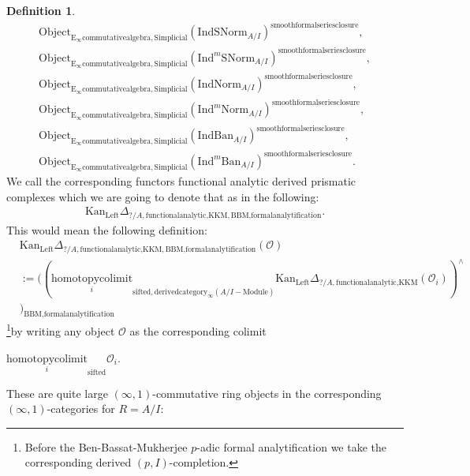 \documentclass[11pt]{book}
\theoremstyle{definition}
\newtheorem{definition}[theorem]{Definition}
\numberwithin{equation}{section}
\begin{document}
\begin{definition}
\begin{align}
\mathrm{Object}_{\mathrm{E}_\infty\mathrm{commutativealgebra},\mathrm{Simplicial}}(\mathrm{IndSNorm}_{A/I})^{\mathrm{smoothformalseriesclosure}},\\
\mathrm{Object}_{\mathrm{E}_\infty\mathrm{commutativealgebra},\mathrm{Simplicial}}(\mathrm{Ind}^m\mathrm{SNorm}_{A/I})^{\mathrm{smoothformalseriesclosure}},\\
\mathrm{Object}_{\mathrm{E}_\infty\mathrm{commutativealgebra},\mathrm{Simplicial}}(\mathrm{IndNorm}_{A/I})^{\mathrm{smoothformalseriesclosure}},\\
\mathrm{Object}_{\mathrm{E}_\infty\mathrm{commutativealgebra},\mathrm{Simplicial}}(\mathrm{Ind}^m\mathrm{Norm}_{A/I})^{\mathrm{smoothformalseriesclosure}},\\
\mathrm{Object}_{\mathrm{E}_\infty\mathrm{commutativealgebra},\mathrm{Simplicial}}(\mathrm{IndBan}_{A/I})^{\mathrm{smoothformalseriesclosure}},\\
\mathrm{Object}_{\mathrm{E}_\infty\mathrm{commutativealgebra},\mathrm{Simplicial}}(\mathrm{Ind}^m\mathrm{Ban}_{A/I})^{\mathrm{smoothformalseriesclosure}}.
\end{align}
We call the corresponding functors functional analytic derived prismatic complexes which we are going to denote that as in the following:
\begin{align}
\mathrm{Kan}_{\mathrm{Left}}\Delta_{?/A,\text{functionalanalytic,KKM},\text{BBM,formalanalytification}}.	
\end{align}
This would mean the following definition:
\begin{align}
&\mathrm{Kan}_{\mathrm{Left}}\Delta_{?/A,\text{functionalanalytic,KKM},\text{BBM,formalanalytification}}(\mathcal{O})\\
&:=	((\underset{i}{\text{homotopycolimit}}_{\text{sifted},\text{derivedcategory}_{\infty}(A/I-\text{Module})}\mathrm{Kan}_{\mathrm{Left}}\Delta_{?/A,\text{functionalanalytic,KKM}}(\mathcal{O}_i))^\wedge\\
&)_\text{BBM,formalanalytification}
\end{align}
\footnote{Before the Ben-Bassat-Mukherjee $p$-adic formal analytification we take the corresponding derived $(p,I)$-completion.}by writing any object $\mathcal{O}$ as the corresponding colimit 
\begin{center}
$\underset{i}{\text{homotopycolimit}}_\text{sifted}\mathcal{O}_i$.
\end{center}
These are quite large $(\infty,1)$-commutative ring objects in the corresponding $(\infty,1)$-categories for $R=A/I$:

\end{definition}
\end{document}
